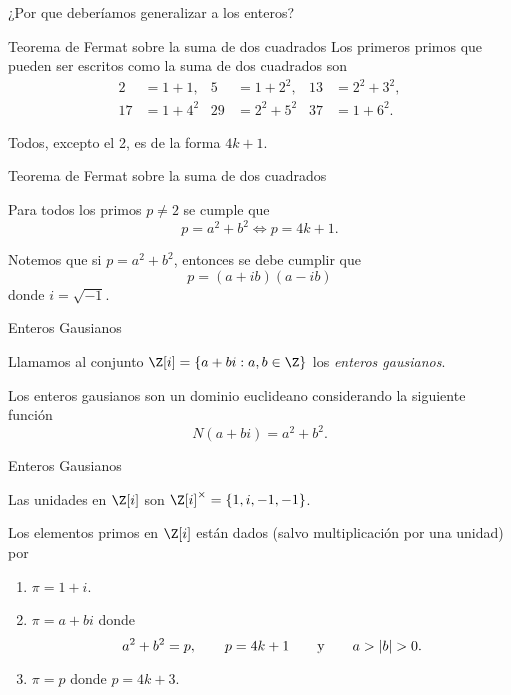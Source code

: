 \begin{frame}
  \begin{center}\fontsize{20}{24}\selectfont
    ¿Por que deberíamos generalizar a los enteros?
  \end{center}
\end{frame}


\begin{frame}{Teorema de Fermat sobre la suma de dos cuadrados}
  Los primeros primos que pueden ser escritos como la suma de dos cuadrados son
  \begin{align*}
    2 &= 1 + 1, &
    5 &= 1 + 2^2, &
    13 &= 2^2 + 3^2, \\
    17 &= 1 + 4^2 &
    29 &= 2^2 + 5^2 &
    37 &= 1 + 6^2.
  \end{align*}

  \pause\bigskip
  Todos, excepto el 2, es de la forma $4k + 1$.
\end{frame}

\begin{frame}{Teorema de Fermat sobre la suma de dos cuadrados}
  \begin{theorem}[Fermat]
    Para todos los primos $p \neq 2$ se cumple que 
    \[
      p = a^2 + b^2 \iff p = 4k + 1.
    \]
  \end{theorem}

  \pause\bigskip
  Notemos que si $p = a^2 + b^2$, entonces se debe cumplir que
  \[
    p = (a + ib)(a - ib)
  \]
  donde $i = \sqrt{-1}$.
\end{frame}

\begin{frame}{Enteros Gausianos}
  \begin{definition}
    Llamamos al conjunto $\Z[i] = \{a + bi : a,b \in \Z\}$ los \emph{enteros gausianos}.
  \end{definition}

  \pause\bigskip

  \begin{theorem}
    Los enteros gausianos son un dominio euclideano considerando la siguiente función 
    \[
      N(a + bi) = a^2 + b^2.
    \]
  \end{theorem}
\end{frame}



\begin{frame}{Enteros Gausianos}
  \begin{theorem}
    Las unidades en $\Z[i]$ son $\Z[i]^\times = \{1, i, -1, -1\}$.
  \end{theorem}

  \begin{theorem}
    Los elementos primos en $\Z[i]$ están dados (salvo multiplicación por una unidad) por
    \begin{enumerate}
      \item $ \pi = 1 + i$.
      \item $ \pi = a + bi$ donde 
      \[
        a^2 + b^2 = p, \qquad p = 4k+1 \qquad\text{y}\qquad a > \mathopen|b\mathclose| > 0.
      \]
      \item $\pi = p$ donde $p = 4k + 3$.
    \end{enumerate}
  \end{theorem}
\end{frame}

